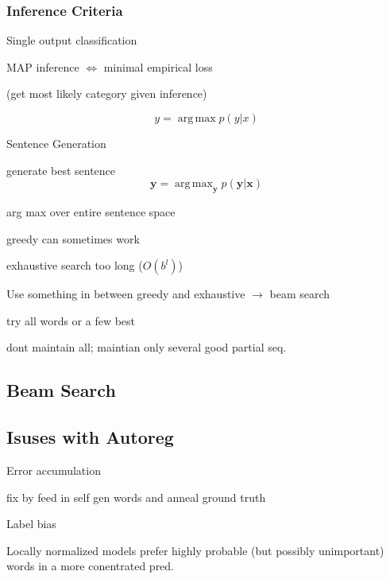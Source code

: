 \documentclass{article}
\DeclareMathOperator*{\argmax}{arg\,max}
\begin{document}
\subsubsection{Inference Criteria}
Single output classification
\begin{list}{}{}
    \item MAP inference $\iff$ minimal empirical loss 
    \item (get most likely category given inference)
    \item \[
        y = \argmax p(y | x)
    \]
\end{list}
Sentence Generation
\begin{list}{}{}
    \item generate best sentence
    \[
        \mathbf y = \argmax_\mathbf y p(\mathbf{y | x})
    \]
    \item arg max over entire sentence space
    \item greedy can sometimes work
    \item exhaustive search too long ($O(b^l)$)
\end{list}
Use something in between greedy and exhaustive $\to$ beam search
\begin{list}{}{}
    \item try all words or a few best
    \item dont maintain all; maintian only several good partial seq. 
\end{list}

\subsection{Beam Search}


\subsection{Isuses with Autoreg}
Error accumulation
\begin{list}{}{}
    \item fix by feed in self gen words and anneal ground truth
\end{list}
Label bias
\begin{list}{}{}
    \item Locally normalized models prefer highly probable (but possibly unimportant)
    words in a more conentrated pred.
\end{list}
\end{document}
